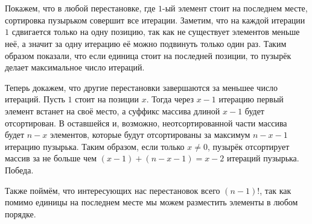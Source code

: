 \section{}
	Покажем, что в любой перестановке, где $1$-ый элемент стоит на последнем месте, сортировка пузырьком совершит все итерации. Заметим, что на каждой итерации $1$ сдвигается только на одну позицию, так как не существует элементов меньше неё, а значит за одну итерацию её можно подвинуть только один раз. Таким образом показали, что если единица стоит на последней позиции, то пузырёк делает максимальное число итераций.
	
	Теперь докажем, что другие перестановки завершаются за меньшее число итераций. Пусть $1$ стоит на позиции $x$. Тогда через $x-1$ итерацию первый элемент встанет на своё место, а суффикс массива длиной $x-1$ будет отсортирован. В оставшейся и, возможно, неотсортированной части массива будет $n - x$ элементов, которые будут отсортированы за максимум $n-x-1$ итерацию пузырька. Таким образом, если только $x\neq 0$, пузырёк отсортирует массив за не больше чем $(x-1) + (n-x-1) = x-2$ итераций пузырька. Победа. 
	
	Также поймём, что интересующих нас перестановок всего $(n-1)!$, так как помимо единицы на последнем месте мы можем разместить элементы в любом порядке.